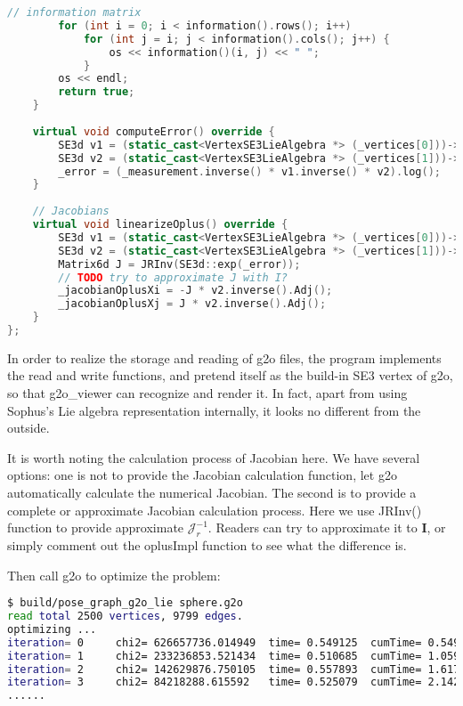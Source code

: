 \begin{lstlisting}[language=c++,caption=slambook2/ch10/pose\_graph\_g2o\_lie\_algebra.cpp()part)]
		// information matrix 
		for (int i = 0; i < information().rows(); i++)
			for (int j = i; j < information().cols(); j++) {
				os << information()(i, j) << " ";
			}
		os << endl;
		return true;
	}
	
	virtual void computeError() override {
		SE3d v1 = (static_cast<VertexSE3LieAlgebra *> (_vertices[0]))->estimate();
		SE3d v2 = (static_cast<VertexSE3LieAlgebra *> (_vertices[1]))->estimate();
		_error = (_measurement.inverse() * v1.inverse() * v2).log();
	}
	
	// Jacobians
	virtual void linearizeOplus() override {
		SE3d v1 = (static_cast<VertexSE3LieAlgebra *> (_vertices[0]))->estimate();
		SE3d v2 = (static_cast<VertexSE3LieAlgebra *> (_vertices[1]))->estimate();
		Matrix6d J = JRInv(SE3d::exp(_error));
		// TODO try to approximate J with I?
		_jacobianOplusXi = -J * v2.inverse().Adj();
		_jacobianOplusXj = J * v2.inverse().Adj();
	}
};
\end{lstlisting}

In order to realize the storage and reading of g2o files, the program implements the read and write functions, and pretend itself as the build-in SE3 vertex of g2o, so that g2o\_viewer can recognize and render it. In fact, apart from using Sophus's Lie algebra representation internally, it looks no different from the outside.

It is worth noting the calculation process of Jacobian here. We have several options: one is not to provide the Jacobian calculation function, let g2o automatically calculate the numerical Jacobian. The second is to provide a complete or approximate Jacobian calculation process. Here we use JRInv() function to provide approximate $\bm{\mathcal{J}}_r^{-1}$. Readers can try to approximate it to $\bm{I}$, or simply comment out the oplusImpl function to see what the difference is.

Then call g2o to optimize the problem:
\begin{lstlisting}[language=sh,caption=Terminal input:]
$ build/pose_graph_g2o_lie sphere.g2o    
read total 2500 vertices, 9799 edges.
optimizing ...
iteration= 0	 chi2= 626657736.014949	 time= 0.549125	 cumTime= 0.549125	 edges= 9799	 schur= 0	 lambda= 6706.585223	 levenbergIter= 1
iteration= 1	 chi2= 233236853.521434	 time= 0.510685	 cumTime= 1.05981	 edges= 9799	 schur= 0	 lambda= 2235.528408	 levenbergIter= 1
iteration= 2	 chi2= 142629876.750105	 time= 0.557893	 cumTime= 1.6177	 edges= 9799	 schur= 0	 lambda= 745.176136	 levenbergIter= 1
iteration= 3	 chi2= 84218288.615592	 time= 0.525079	 cumTime= 2.14278	 edges= 9799	 schur= 0	 lambda= 248.392045	 levenbergIter= 1
......
\end{lstlisting}

